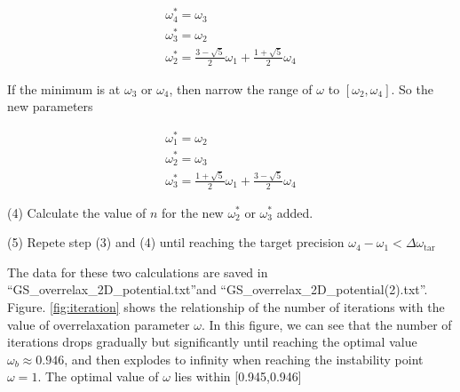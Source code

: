 \documentclass[12pt, graphicx]{article}
\begin{document}
\begin{equation}
\begin{gathered}
\omega_4^*=\omega_3\\
\omega_3^*=\omega_2\\
\omega_2^*=\frac{3-\sqrt{5}}{2}\omega_1+\frac{1+\sqrt{5}}{2}\omega_4
\end{gathered}
\end{equation}

If the minimum is at $\omega_3$ or $\omega_4$, then narrow the range of $\omega$ to $[\omega_2,\omega_4]$. So the new parameters

\begin{equation}
\begin{gathered}
\omega_1^*=\omega_2\\
\omega_2^*=\omega_3\\
\omega_3^*=\frac{1+\sqrt{5}}{2}\omega_1+\frac{3-\sqrt{5}}{2}\omega_4
\end{gathered}
\end{equation}

(4) Calculate the value of $n$ for the new $\omega_2^*$ or $\omega_3^*$ added. \par
(5) Repete step (3) and (4) until reaching the target precision $\omega_4-\omega_1<\Delta\omega_\mathrm{tar}$\par

The data for these two calculations are saved in \textquotedblleft GS\_overrelax\_2D\_potential.txt\textquotedblright and \textquotedblleft GS\_overrelax\_2D\_potential(2).txt\textquotedblright. Figure. \ref{fig:iteration} shows the relationship of the number of iterations with the value of overrelaxation parameter $\omega$. In this figure, we can see that the number of iterations  drops gradually but significantly until reaching the optimal value $\omega_b\approx0.946$, and then explodes to infinity when reaching the instability point $\omega=1$. The optimal value of $\omega$ lies within [0.945,0.946]
\end{document}
